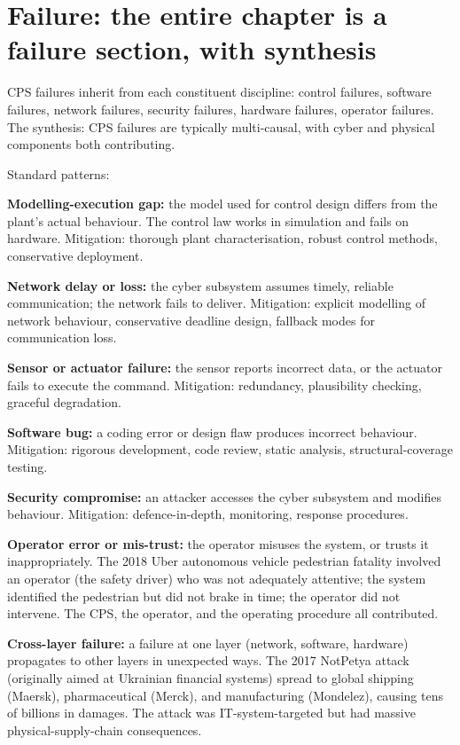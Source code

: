 \section{Failure: the entire chapter is a failure section, with synthesis}

CPS failures inherit from each constituent discipline: control failures, software failures, network failures, security failures, hardware failures, operator failures. The synthesis: CPS failures are typically multi-causal, with cyber and physical components both contributing.

Standard patterns:

\textbf{Modelling-execution gap:} the model used for control design differs from the plant's actual behaviour. The control law works in simulation and fails on hardware. Mitigation: thorough plant characterisation, robust control methods, conservative deployment.

\textbf{Network delay or loss:} the cyber subsystem assumes timely, reliable communication; the network fails to deliver. Mitigation: explicit modelling of network behaviour, conservative deadline design, fallback modes for communication loss.

\textbf{Sensor or actuator failure:} the sensor reports incorrect data, or the actuator fails to execute the command. Mitigation: redundancy, plausibility checking, graceful degradation.

\textbf{Software bug:} a coding error or design flaw produces incorrect behaviour. Mitigation: rigorous development, code review, static analysis, structural-coverage testing.

\textbf{Security compromise:} an attacker accesses the cyber subsystem and modifies behaviour. Mitigation: defence-in-depth, monitoring, response procedures.

\textbf{Operator error or mis-trust:} the operator misuses the system, or trusts it inappropriately. The 2018 Uber autonomous vehicle pedestrian fatality involved an operator (the safety driver) who was not adequately attentive; the system identified the pedestrian but did not brake in time; the operator did not intervene. The CPS, the operator, and the operating procedure all contributed.

\textbf{Cross-layer failure:} a failure at one layer (network, software, hardware) propagates to other layers in unexpected ways. The 2017 NotPetya attack (originally aimed at Ukrainian financial systems) spread to global shipping (Maersk), pharmaceutical (Merck), and manufacturing (Mondelez), causing tens of billions in damages. The attack was IT-system-targeted but had massive physical-supply-chain consequences.

